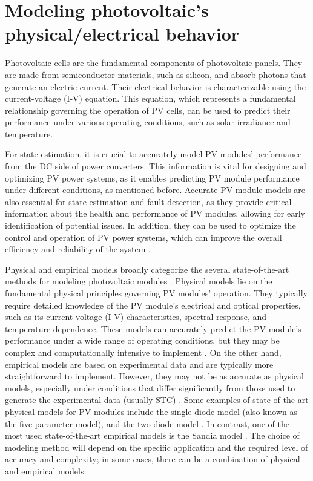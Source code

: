 \section{Modeling photovoltaic's physical/electrical behavior}

Photovoltaic cells are the fundamental components of photovoltaic panels. They are made from semiconductor materials, such as silicon,  and absorb photons that generate an electric current. Their electrical behavior is characterizable using the current-voltage (I-V) equation. This equation, which represents a fundamental relationship governing the operation of PV cells, can be used to predict their performance under various operating conditions, such as solar irradiance and temperature.

For state estimation, it is crucial to accurately model PV modules' performance from the DC side of power converters. This information is vital for designing and optimizing PV power systems, as it enables predicting PV module performance under different conditions, as mentioned before. Accurate PV module models are also essential for state estimation and fault detection, as they provide critical information about the health and performance of PV modules, allowing for early identification of potential issues. In addition, they can be used to optimize the control and operation of PV power systems, which can improve the overall efficiency and reliability of the system \cite{Braun2011}.

Physical and empirical models broadly categorize the several state-of-the-art methods for modeling photovoltaic modules \cite{Braun2011}. Physical models lie on the fundamental physical principles governing PV modules' operation. They typically require detailed knowledge of the PV module's electrical and optical properties, such as its current-voltage (I-V) characteristics, spectral response, and temperature dependence. These models can accurately predict the PV module's performance under a wide range of operating conditions, but they may be complex and computationally intensive to implement \cite{Kumar2019}. On the other hand, empirical models are based on experimental data and are typically more straightforward to implement. However, they may not be as accurate as physical models, especially under conditions that differ significantly from those used to generate the experimental data (usually STC) \cite{Braun2011}. Some examples of state-of-the-art physical models for PV modules include the single-diode model (also known as the five-parameter model), and the two-diode model \cite{Godina2017}. In contrast, one of the most used state-of-the-art empirical models is the Sandia model \cite{Braun2011}. The choice of modeling method will depend on the specific application and the required level of accuracy and complexity; in some cases, there can be a combination of physical and empirical models.

